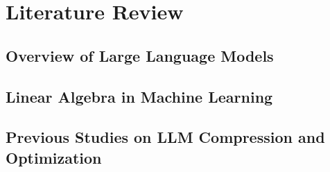 \chapter{Literature Review}

\section{Overview of Large Language Models}

\section{Linear Algebra in Machine Learning}

\section{Previous Studies on LLM Compression and Optimization}